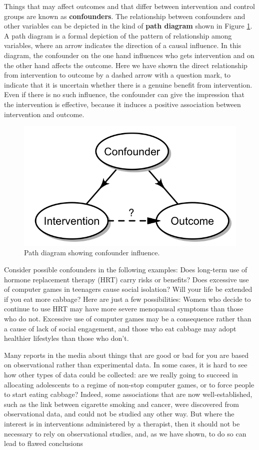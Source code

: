 \documentclass{krantz}
\begin{document}
Things that may affect outcomes and that differ between intervention and control groups are known as \textbf{confounders}. The relationship between confounders and other variables can be depicted in the kind of \textbf{path diagram} shown in Figure \ref{fig:confoundfig}. A path diagram is a formal depiction of the pattern of relationship among variables, where an arrow indicates the direction of a causal influence. In this diagram, the confounder on the one hand influences who gets intervention and on the other hand affects the outcome. Here we have shown the direct relationship from intervention to outcome by a dashed arrow with a question mark, to indicate that it is uncertain whether there is a genuine benefit from intervention. Even if there is no such influence, the confounder can give the impression that the intervention is effective, because it induces a positive association between intervention and outcome.

\begin{figure}
\includegraphics[width=0.5\linewidth]{images_bw/confounder} \caption{Path diagram showing confounder influence.}\label{fig:confoundfig}
\end{figure}

Consider possible confounders in the following examples: Does long-term use of hormone replacement therapy (HRT) carry risks or benefits? Does excessive use of computer games in teenagers cause social isolation? Will your life be extended if you eat more cabbage? Here are just a few possibilities: Women who decide to continue to use HRT may have more severe menopausal symptoms than those who do not. Excessive use of computer games may be a consequence rather than a cause of lack of social engagement, and those who eat cabbage may adopt healthier lifestyles than those who don't.

Many reports in the media about things that are good or bad for you are based on observational rather than experimental data. In some cases, it is hard to see how other types of data could be collected: are we really going to succeed in allocating adolescents to a regime of non-stop computer games, or to force people to start eating cabbage? Indeed, some associations that are now well-established, such as the link between cigarette smoking and cancer, were discovered from observational data, and could not be studied any other way. But where the interest is in interventions administered by a therapist, then it should not be necessary to rely on observational studies, and, as we have shown, to do so can lead to flawed conclusions
\end{document}
